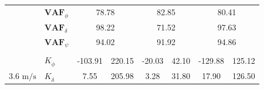 \begin{table}[]
\begin{tabular}{llcccccc}
                                                   & $\mathbf{VAF}_\phi$                                    & \multicolumn{2}{c}{78.78}                                                                          & \multicolumn{2}{c}{82.85}                                                                          & \multicolumn{2}{c}{80.41}                                                                          \\
                                                   & $\mathbf{VAF}_\delta$                                  & \multicolumn{2}{c}{98.22}                                                                          & \multicolumn{2}{c}{71.52}                                                                          & \multicolumn{2}{c}{97.63}                                                                          \\
                                                   & $\mathbf{VAF}_\psi$                                    & \multicolumn{2}{c}{94.02}                                                                          & \multicolumn{2}{c}{91.92}                                                                          & \multicolumn{2}{c}{94.86}                                                                          \\
                                                   &                                                        & \multicolumn{1}{l}{}                        & \multicolumn{1}{l}{}                                 & \multicolumn{1}{l}{}                        & \multicolumn{1}{l}{}                                 & \multicolumn{1}{l}{}                        & \multicolumn{1}{l}{}                                 \\ \hline
                                                   & $K_{\dot{\phi}} $                                      & -103.91                                     & 220.15                                               & -20.03                                      & 42.10                                                & -129.88                                     & 125.12                                               \\
    \multirow{-2}{*}{3.6 $\si{\meter\per\second}$} & $K_{\dot{\delta}}$                                     & 7.55                                        & 205.98                                               & 3.28                                        & 31.80                                                & 17.90                                       & 126.50                                               \\

\end{tabular}
\end{table}
